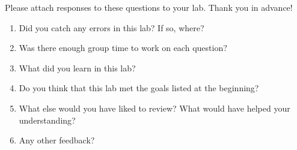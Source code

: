\documentclass{exam}
\begin{document}
Please attach responses to these questions to your lab. Thank you in advance!

\begin{enumerate}
\item Did you catch any errors in this lab? If so, where?
\item Was there enough group time to work on each question?
\item What did you learn in this lab?
\item Do you think that this lab met the goals listed at the beginning? 
\item What else would you have liked to review? What would have helped your understanding?
\item Any other feedback?
\end{enumerate}
\end{document}
